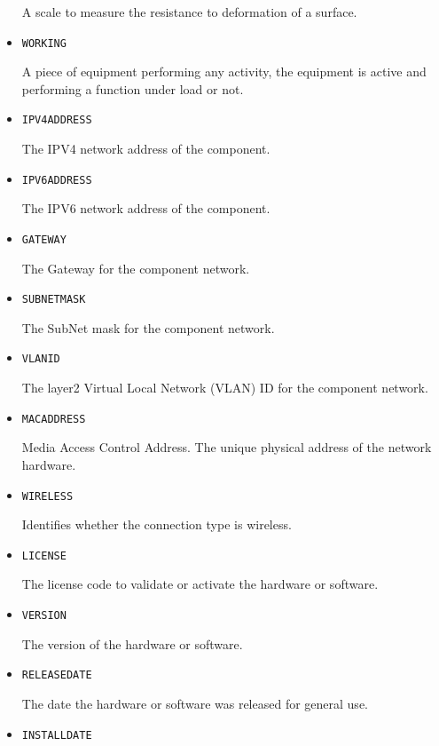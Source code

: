 \begin{itemize}
A scale to measure the resistance to deformation of a surface.


\item \texttt{WORKING}  

A piece of equipment performing any activity, the equipment is active and performing a function under load or not.


\item \texttt{IPV4\textunderscore ADDRESS}  

The IPV4 network address of the component.


\item \texttt{IPV6\textunderscore ADDRESS}  

The IPV6 network address of the component.


\item \texttt{GATEWAY}  

The Gateway for the component network.


\item \texttt{SUBNET\textunderscore MASK}  

The SubNet mask for the component network.



\item \texttt{VLAN\textunderscore ID}  

The layer2 Virtual Local Network (VLAN) ID for the component network.


\item \texttt{MAC\textunderscore ADDRESS}  

Media Access Control Address. The unique physical address of the network hardware.


\item \texttt{WIRELESS}  

Identifies whether the connection type is wireless.


\item \texttt{LICENSE}  

The license code to validate or activate the hardware or software.


\item \texttt{VERSION}  

The version of the hardware or software.



\item \texttt{RELEASE\textunderscore DATE}  

The date the hardware or software was released for general use.


\item \texttt{INSTALL\textunderscore DATE}  


\end{itemize}
